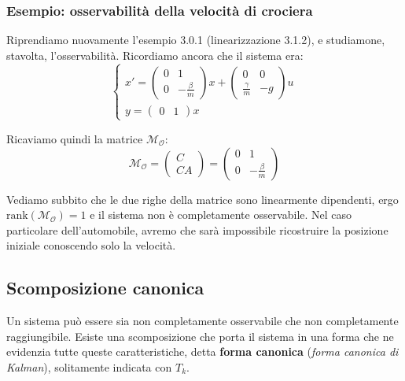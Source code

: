 \documentclass[a4paper,11pt]{article}
\begin{document}
\subsubsection{Esempio: osservabilità della velocità di crociera}
Riprendiamo nuovamente l'esempio 3.0.1 (linearizzazione 3.1.2), e studiamone, stavolta, l'osservabilità.
Ricordiamo ancora che il sistema era:
\[
	\begin{cases}
		x' = \begin{pmatrix}
			0 & 1 \\
			0 & -\frac{\beta}{m}
		\end{pmatrix} x + \begin{pmatrix}
			0 & 0 \\ 
			\frac{\gamma}{m} & -g
		\end{pmatrix}	u \\ 
		y = \begin{pmatrix}
			0 & 1
		\end{pmatrix} x
	\end{cases}
\]

Ricaviamo quindi la matrice $\mathcal{M}_\mathcal{O}$:
$$
\mathcal{M}_\mathcal{O} = \begin{pmatrix}
 C \\ C A
\end{pmatrix} = \begin{pmatrix}
	0 & 1 \\
	0 & -\frac{\beta}{m}
\end{pmatrix}
$$

Vediamo subbito che le due righe della matrice sono linearmente dipendenti, ergo $\mathrm{rank}(\mathcal{M}_\mathcal{O}) = 1$ e il sistema non è completamente osservabile.
Nel caso particolare dell'automobile, avremo che sarà impossibile ricostruire la posizione iniziale conoscendo solo la velocità.

\subsection{Scomposizione canonica}
Un sistema può essere sia non completamente osservabile che non completamente raggiungibile.
Esiste una scomposizione che porta il sistema in una forma che ne evidenzia tutte queste caratteristiche, detta \textbf{forma canonica} (\textit{forma canonica di Kalman}), solitamente indicata con $T_k$.
\end{document}
